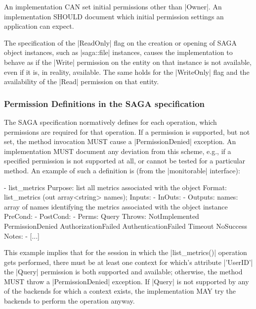  
  An implementation CAN set initial permissions other than
  |Owner|.  An implementation SHOULD document which initial
  permission settings an application can expect.
 
  The specification of the |ReadOnly| flag on the creation or
  opening of SAGA object instances, such as |saga::file|
  instances, causes the implementation to behave as if the
  |Write| permission on the entity on that instance is not
  available, even if it is, in reality, available.  The same
  holds for the |WriteOnly| flag and the availability of the
  |Read| permission on that entity.
 
 \subsubsection*{Permission Definitions in the SAGA specification}
 
  The SAGA specification normatively defines for each operation,
  which permissions are required for that operation.  If a
  permission is supported, but not set, the method invocation
  MUST cause a |PermissionDenied| exception.  An implementation
  MUST document any deviation from this scheme, e.g., if a
  specified permission is not supported at all, or cannot be
  tested for a particular method.  An example of such a definition is
  (from the |monitorable| interface):
 
  \begin{myspec}
    - list_metrics
      Purpose:  list all metrics associated with the object
      Format:   list_metrics       (out array<string>   names);
      Inputs:   -
      InOuts:   -
      Outputs:  names:              array of names identifying
                                    the metrics associated with
                                    the object instance
      PreCond:  -
      PostCond: -
      Perms:    Query
      Throws:   NotImplemented
                PermissionDenied
                AuthorizationFailed
                AuthenticationFailed
                Timeout
                NoSuccess
      Notes:    - [...]
  \end{myspec}
 
  This example implies that for the session in which the
  |list_metrics()| operation gets performed, there must be at least
  one context for which's attribute |'UserID'| the |Query|
  permission is both supported and available; otherwise, the method
  MUST throw a |PermissionDenied| exception.  If |Query| is not
  supported by any of the backends for which a context exists,
  the implementation MAY try the backends to perform the
  operation anyway.
 
